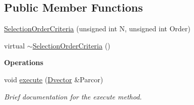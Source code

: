 \subsection*{Public Member Functions}
\begin{DoxyCompactItemize}
\item 
\hyperlink{classtsa_1_1_selection_order_criteria_a0f94155c1a172ae6368f8ffdc33092e9}{Selection\+Order\+Criteria} (unsigned int N, unsigned int Order)
\item 
virtual \hyperlink{classtsa_1_1_selection_order_criteria_a5c3fd909a347a327ecc326bd2be51893}{$\sim$\+Selection\+Order\+Criteria} ()
\end{DoxyCompactItemize}
\begin{Indent}\textbf{ Operations}\par
\begin{DoxyCompactItemize}
\item 
void \hyperlink{classtsa_1_1_selection_order_criteria_a0ad59c956379f34330a85284ba28cffa}{execute} (\hyperlink{namespacetsa_a8900fb03d849baf447a1a0efe2561fb2}{Dvector} \&Parcor)
\begin{DoxyCompactList}\small\item\em Brief documentation for the execute method. \end{DoxyCompactList}\end{DoxyCompactItemize}
\end{Indent}
